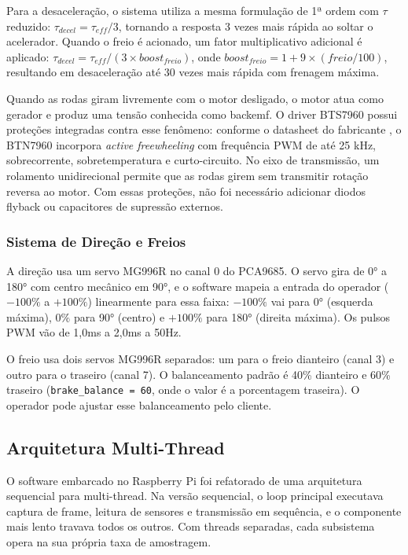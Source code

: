 Para a desaceleração, o sistema utiliza a mesma formulação de 1ª ordem com $\tau$ reduzido: $\tau_{decel} = \tau_{eff} / 3$, tornando a resposta 3 vezes mais rápida ao soltar o acelerador. Quando o freio é acionado, um fator multiplicativo adicional é aplicado: $\tau_{decel} = \tau_{eff} / (3 \times boost_{freio})$, onde $boost_{freio} = 1 + 9 \times (freio/100)$, resultando em desaceleração até 30 vezes mais rápida com frenagem máxima.

Quando as rodas giram livremente com o motor desligado, o motor atua como gerador e produz uma tensão conhecida como \gls{backemf}. O driver BTS7960 possui proteções integradas contra esse fenômeno: conforme o datasheet do fabricante , o BTN7960 incorpora \textit{active freewheeling} com frequência PWM de até 25 kHz, sobrecorrente, sobretemperatura e curto-circuito. No eixo de transmissão, um rolamento unidirecional permite que as rodas girem sem transmitir rotação reversa ao motor. Com essas proteções, não foi necessário adicionar diodos flyback ou capacitores de supressão externos.

\subsubsection{Sistema de Direção e Freios}

A direção usa um servo MG996R no canal 0 do PCA9685. O servo gira de 0° a 180° com centro mecânico em 90°, e o software mapeia a entrada do operador ($-100\%$ a $+100\%$) linearmente para essa faixa: $-100\%$ vai para 0° (esquerda máxima), $0\%$ para 90° (centro) e $+100\%$ para 180° (direita máxima). Os pulsos \gls{PWM} vão de 1,0ms a 2,0ms a 50Hz.

O freio usa dois servos MG996R separados: um para o freio dianteiro (canal 3) e outro para o traseiro (canal 7). O balanceamento padrão é 40\% dianteiro e 60\% traseiro (\texttt{brake\_balance = 60}, onde o valor é a porcentagem traseira). O operador pode ajustar esse balanceamento pelo cliente.

\subsection{Arquitetura Multi-Thread}
\label{subsec:multithread-veiculo}

O software embarcado no Raspberry Pi foi refatorado de uma arquitetura sequencial para multi-thread. Na versão sequencial, o loop principal executava captura de frame, leitura de sensores e transmissão em sequência, e o componente mais lento travava todos os outros. Com threads separadas, cada subsistema opera na sua própria taxa de amostragem.

